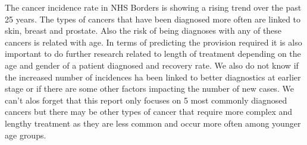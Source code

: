 \documentclass[
]{article}
\begin{document}
The cancer incidence rate in NHS Borders is showing a rising trend over
the past 25 years. The types of cancers that have been diagnosed more
often are linked to skin, breast and prostate. Also the risk of being
diagnoses with any of these cancers is related with age. In terms of
predicting the provision required it is also important to do further
research related to length of treatment depending on the age and gender
of a patient diagnosed and recovery rate. We also do not know if the
increased number of incidences ha been linked to better diagnostics at
earlier stage or if there are some other factors impacting the number of
new cases. We can't alos forget that this report only focuses on 5 most
commonly diagnosed cancers but there may be other types of cancer that
require more complex and lengthy treatment as they are less common and
occur more often among younger age groups.
\end{document}
